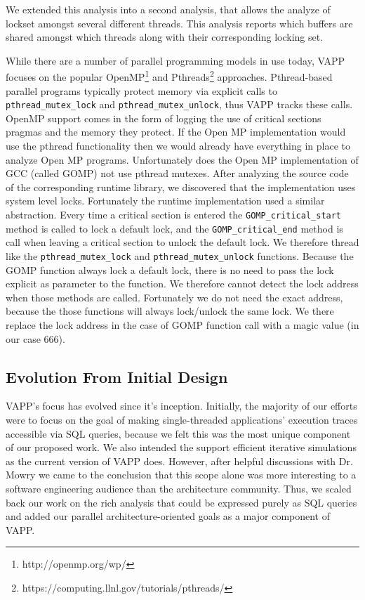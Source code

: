 We extended this analysis into a second analysis, that allows the
analyze of lockset amongst several different threads. This analysis
reports which buffers are shared amongst which threads along with
their corresponding locking set.

While there are a number of parallel programming models in use today,
VAPP focuses on the popular OpenMP\footnote{http://openmp.org/wp/} and
Pthreads\footnote{https://computing.llnl.gov/tutorials/pthreads/}
approaches.  Pthread-based parallel programs typically protect memory
via explicit calls to \texttt{pthread\_mutex\_lock} and
\texttt{pthread\_mutex\_unlock}, thus VAPP tracks these calls.  OpenMP
support comes in the form of logging the use of critical sections
pragmas and the memory they protect. If the Open MP implementation
would use the pthread functionality then we would already have
everything in place to analyze Open MP programs. Unfortunately does
the Open MP implementation of GCC (called GOMP) not use pthread
mutexes. After analyzing the source code of the corresponding runtime
library, we discovered that the implementation uses system level
locks. Fortunately the runtime implementation used a similar
abstraction. Every time a critical section is entered the
\texttt{GOMP\_critical\_start} method is called to lock a default
lock, and the \texttt{GOMP\_critical\_end} method is call when leaving
a critical section to unlock the default lock. We therefore thread
like the \texttt{pthread\_mutex\_lock} and
\texttt{pthread\_mutex\_unlock} functions. Because the GOMP function
always lock a default lock, there is no need to pass the lock explicit
as parameter to the function. We therefore cannot detect the lock
address when those methods are called. Fortunately we do not need the
exact address, because the those functions will always lock/unlock the
same lock. We there replace the lock address in the case of GOMP
function call with a magic value (in our case 666).

\subsection{Evolution From Initial Design}
VAPP's focus has evolved since it's inception.  Initially, the
majority of our efforts were to focus on the goal of making
single-threaded applications' execution traces accessible via SQL
queries, because we felt this was the most unique component of our
proposed work.  We also intended the support efficient iterative
simulations as the current version of VAPP does.  However, after
helpful discussions with Dr. Mowry we came to the conclusion that this
scope alone was more interesting to a software engineering audience
than the architecture community.  Thus, we scaled back our work on the
rich analysis that could be expressed purely as SQL queries and added
our parallel architecture-oriented goals as a major component of VAPP.

